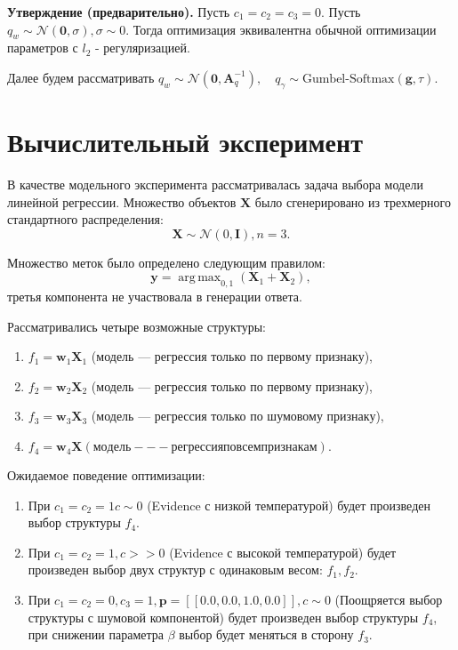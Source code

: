 \documentclass[12pt]{article}
\DeclareMathOperator*{\argmax}{arg\,max}
\begin{document}
\textbf{Утверждение (предварительно).} Пусть $c_1 = c_2 = c_3 = 0$. Пусть $q_w \sim \mathcal{N}(\mathbf{0}, \sigma), \sigma \sim 0$. 
Тогда оптимизация эквивалентна обычной оптимизации параметров с $l_2$ - регуляризацией.

Далее будем рассматривать $q_w \sim \mathcal{N}(\mathbf{0}, \mathbf{A}_q^{-1}), \quad q_\gamma \sim \text{Gumbel-Softmax}(\mathbf{g}, \tau).$

\section{Вычислительный эксперимент}
В качестве модельного эксперимента рассматривалась задача выбора модели линейной регрессии.
Множество объектов $\mathbf{X}$ было сгенерировано из трехмерного стандартного распределения: 
\[
    \mathbf{X} \sim \mathcal{N}(0, \mathbf{I}), n = 3.
\]

Множество меток было определено следующим правилом:
\[
    \mathbf{y}= \argmax_{0,1} (\mathbf{X}_1 + \mathbf{X}_2),
\]
третья компонента не участвовала в генерации ответа.

Рассматривались четыре возможные структуры:
\begin{enumerate}
\item $f_1 = \mathbf{w}_1 \mathbf{X}_1$ (модель --- регрессия только по первому признаку), 

\item $f_2 = \mathbf{w}_2 \mathbf{X}_2$ (модель --- регрессия только по первому признаку), 

\item $f_3 = \mathbf{w}_3 \mathbf{X}_3$ (модель --- регрессия только по шумовому признаку), 

\item $f_4 = \mathbf{w}_4 \mathbf{X} (модель --- регрессия по всем признакам). $
\end{enumerate}

Ожидаемое поведение оптимизации:
\begin{enumerate}
\item При $c_1 = c_2 = 1 c \sim 0$ (Evidence с низкой температурой) будет произведен выбор структуры $f_4$.

\item При $c_1 = c_2 = 1, c >>0$ (Evidence с высокой температурой) будет произведен выбор двух структур с одинаковым весом: $f_1, f_2$.

\item При $c_1 = c_2 = 0, c_3 = 1, \mathbf{p}= [[0.0, 0.0, 1.0, 0.0]], c \sim 0$ (Поощряется выбор структуры с шумовой компонентой) будет произведен выбор структуры $f_4$, при снижении параметра $\beta$ выбор будет меняться в сторону $f_3$.
\end{enumerate}
\end{document}
